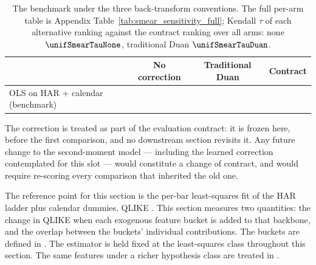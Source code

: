 \begin{table}[H]
\centering
\caption{The benchmark under the three back-transform conventions. The
full per-arm table is Appendix Table~\ref{tab:smear_sensitivity_full};
Kendall $\tau$ of each alternative ranking against the contract ranking
over all arms: none $\unifSmearTauNone$, traditional Duan
$\unifSmearTauDuan$.}
\label{tab:smear_sensitivity}
\begin{tabular}{@{}lccc@{}}
\toprule
 & No correction & Traditional Duan & Contract \\
\midrule
OLS on HAR $+$ calendar (benchmark) & \unifAzeroQLIKENone{} & \unifAzeroQLIKEDuan{} & \unifAzeroQLIKE{} \\
\bottomrule
\end{tabular}
\end{table}

The correction is treated as part of the evaluation contract: it is frozen
here, before the first comparison, and no downstream section revisits it.
Any future change to the second-moment model --- including the learned
correction contemplated for this slot --- would constitute a change of
contract, and would require re-scoring every comparison that inherited the
old one.


The reference point for this section is the per-bar least-squares fit of the
HAR ladder plus calendar dummies, QLIKE \unifAzeroQLIKE{}. This section
measures two quantities: the change in
QLIKE when each exogenous feature bucket is added to that backbone, and the
overlap between the buckets' individual contributions. The buckets are defined
in .
The estimator is held fixed at the least-squares class throughout this
section. The same features under a richer hypothesis class are treated in
.

